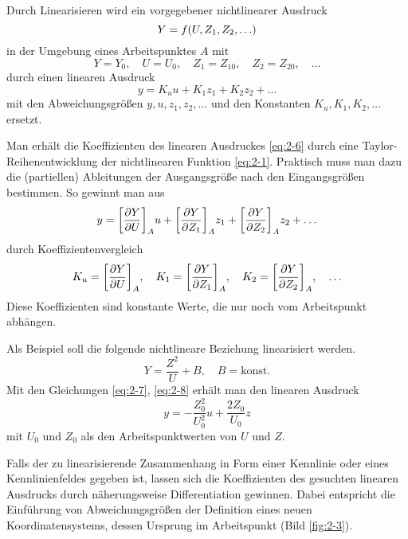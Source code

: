 Durch Linearisieren wird ein vorgegebener nichtlinearer Ausdruck
\[
    Y = f\parentheses*{U, Z_1, Z_2, \ldots}
\]
in der Umgebung eines Arbeitspunktes \(A\) mit
\begin{equation}\label{eq:2-6}
    Y = Y_0, \quad U = U_0, \quad Z_1 = Z_{10}, \quad Z_2 = Z_{20}, \quad \ldots
\end{equation}
durch einen linearen Ausdruck
\begin{equation}
    y = K_u u + K_1 z_1 + K_2 z_2 + \ldots
\end{equation}
mit den Abweichungsgrößen \(y, u, z_1, z_2, \ldots\) und den Konstanten \(K_u, K_1, K_2, \ldots\) ersetzt.

Man erhält die Koeffizienten des linearen Ausdruckes \eqref{eq:2-6} durch eine Taylor-Reihenentwicklung der nichtlinearen Funktion \eqref{eq:2-1}.
Praktisch muss man dazu die (partiellen) Ableitungen der Ausgangsgröße nach den Eingangsgrößen bestimmen. So gewinnt man aus
\begin{equation}\label{eq:2-7}
    y = \brackets*{\frac{\partial Y}{\partial U}}_A u + \brackets*{\frac{\partial Y}{\partial Z_1}}_A z_1 + \brackets*{\frac{\partial Y}{\partial Z_2}}_A z_2 + \ldots
\end{equation}
durch Koeffizientenvergleich
\begin{equation}\label{eq:2-8}
    K_u = \brackets*{\frac{\partial Y}{\partial U}}_A, \quad K_1 = \brackets*{\frac{\partial Y}{\partial Z_1}}_A, \quad K_2 = \brackets*{\frac{\partial Y}{\partial Z_2}}_A, \quad \ldots
\end{equation}
Diese Koeffizienten sind konstante Werte, die nur noch vom Arbeitspunkt abhängen.

Als Beispiel soll die folgende nichtlineare Beziehung linearisiert werden.
\begin{equation}
    Y = \frac{Z^2}{U} + B, \quad B = \text{konst}.
\end{equation}
Mit den Gleichungen \eqref{eq:2-7}, \eqref{eq:2-8} erhält man den linearen Ausdruck
\begin{equation}
    y = -\frac{Z_0^2}{U_0^2}u + \frac{2Z_0}{U_0}z
\end{equation}
mit \(U_0\) und \(Z_0\) als den Arbeitspunktwerten von \(U\) und \(Z\).

Falls der zu linearisierende Zusammenhang in Form einer Kennlinie oder eines Kennlinienfeldes gegeben ist, lassen sich die Koeffizienten des gesuchten linearen Ausdrucks durch näherungsweise Differentiation gewinnen.
Dabei entspricht die Einführung von Abweichungsgrößen der Definition eines neuen Koordinatensystems, dessen Ursprung im Arbeitspunkt (Bild \ref{fig:2-3}).

